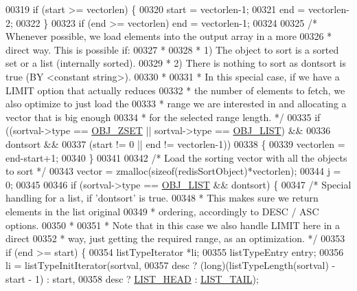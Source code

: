 \begin{DoxyCode}
00319     \textcolor{keywordflow}{if} (start >= vectorlen) \{
00320         start = vectorlen-1;
00321         end = vectorlen-2;
00322     \}
00323     \textcolor{keywordflow}{if} (end >= vectorlen) end = vectorlen-1;
00324 
00325     \textcolor{comment}{/* Whenever possible, we load elements into the output array in a more}
00326 \textcolor{comment}{     * direct way. This is possible if:}
00327 \textcolor{comment}{     *}
00328 \textcolor{comment}{     * 1) The object to sort is a sorted set or a list (internally sorted).}
00329 \textcolor{comment}{     * 2) There is nothing to sort as dontsort is true (BY <constant string>).}
00330 \textcolor{comment}{     *}
00331 \textcolor{comment}{     * In this special case, if we have a LIMIT option that actually reduces}
00332 \textcolor{comment}{     * the number of elements to fetch, we also optimize to just load the}
00333 \textcolor{comment}{     * range we are interested in and allocating a vector that is big enough}
00334 \textcolor{comment}{     * for the selected range length. */}
00335     \textcolor{keywordflow}{if} ((sortval->type == \hyperlink{server_8h_a8c356422ddbc03bd77694880a30a1953}{OBJ\_ZSET} || sortval->type == \hyperlink{server_8h_a4a5f22a280949c97a0cb0d4213275126}{OBJ\_LIST}) &&
00336         dontsort &&
00337         (start != 0 || end != vectorlen-1))
00338     \{
00339         vectorlen = end-start+1;
00340     \}
00341 
00342     \textcolor{comment}{/* Load the sorting vector with all the objects to sort */}
00343     vector = zmalloc(\textcolor{keyword}{sizeof}(redisSortObject)*vectorlen);
00344     j = 0;
00345 
00346     \textcolor{keywordflow}{if} (sortval->type == \hyperlink{server_8h_a4a5f22a280949c97a0cb0d4213275126}{OBJ\_LIST} && dontsort) \{
00347         \textcolor{comment}{/* Special handling for a list, if 'dontsort' is true.}
00348 \textcolor{comment}{         * This makes sure we return elements in the list original}
00349 \textcolor{comment}{         * ordering, accordingly to DESC / ASC options.}
00350 \textcolor{comment}{         *}
00351 \textcolor{comment}{         * Note that in this case we also handle LIMIT here in a direct}
00352 \textcolor{comment}{         * way, just getting the required range, as an optimization. */}
00353         \textcolor{keywordflow}{if} (end >= start) \{
00354             listTypeIterator *li;
00355             listTypeEntry entry;
00356             li = listTypeInitIterator(sortval,
00357                     desc ? (\textcolor{keywordtype}{long})(listTypeLength(sortval) - start - 1) : start,
00358                     desc ? \hyperlink{server_8h_a5fc6a15ca26c6208f66ad2768a3108ef}{LIST\_HEAD} : \hyperlink{server_8h_a745de98bef5b645df56479181803235b}{LIST\_TAIL});

\end{DoxyCode}
